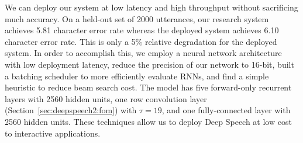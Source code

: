 We can deploy our system at low latency and high throughput without sacrificing
much accuracy. On a held-out set of 2000 utterances, our research system
achieves 5.81 character error rate whereas the deployed system achieves 6.10
character error rate. This is only a 5\% relative degradation for the deployed
system. In order to accomplish this, we employ a neural network architecture
with low deployment latency, reduce the precision of our network to 16-bit,
built a batching scheduler to more efficiently evaluate RNNs, and find a simple
heuristic to reduce beam search cost. The model has five forward-only recurrent
layers with 2560 hidden units, one row convolution layer
(Section~\ref{sec:deepspeech2:fom}) with $\tau=19$, and one fully-connected
layer with 2560 hidden units. These techniques allow us to deploy Deep Speech
at low cost to interactive applications.
